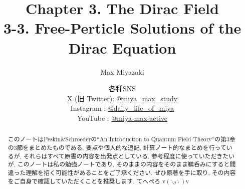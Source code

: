 \documentclass[a4paper,12pt]{article}
\title{Chapter 3. The Dirac Field\\
3-3. Free-Perticle Solutions of the Dirac Equation}
\date{各種SNS\\
    X (旧 Twitter): \href{https://x.com/miya_max_study}{@miya\_max\_study}\\
    Instagram : \href{https://www.instagram.com/daily_life_of_miya/}{@daily\_life\_of\_miya}\\
    YouTube : \href{https://www.youtube.com/@miya-max-active}{@miya-max-active}
    }
\author{Max Miyazaki}
\begin{document}
\maketitle

\vspace{1cm}
\begin{abstract}
    このノートはPeskin\&Schroederの``An Introduction to Quantum Field Theory''の第3章の3節をまとめたものである. 要点や個人的な追記, 計算ノート的なまとめを行っているが, それらはすべて原書の内容を出発点としている. 参考程度に使っていただきたいが, このノートは私の勉強ノートであり, そのままの内容をそのまま鵜呑みにすると間違った理解を招く可能性があることをご了承ください. ぜひ原著を手に取り, その内容をご自身で確認していただくことを推奨します. てへぺろ v$({\hat{\cdot}_\partial \hat{\cdot}})$v
\end{abstract}
    
    

\newpage
\color{blue}
\end{document}
